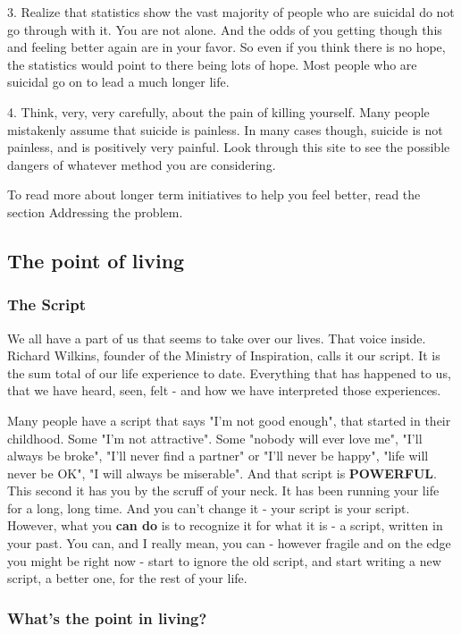 \documentclass[12pt]{article}
\begin{document}
3. Realize that statistics show the vast majority of people who are suicidal do not go through with it. You are not alone. And the odds of you getting though this and feeling better again are in your favor. So even if you think there is no hope, the statistics would point to there being lots of hope. Most people who are suicidal go on to lead a much longer life.

4. Think, very, very carefully, about the pain of killing yourself. Many people mistakenly assume that suicide is painless. In many cases though, suicide is not painless, and is positively very painful. Look through this site to see the possible dangers of whatever method you are considering.

To read more about longer term initiatives to help you feel better, read the section Addressing the problem.

\subsection{The point of living}

\subsubsection{The Script}

We all have a part of us that seems to take over our lives. That voice inside. Richard Wilkins, founder of the Ministry of Inspiration, calls it our script. It is the sum total of our life experience to date. Everything that has happened to us, that we have heard, seen, felt - and how we have interpreted those experiences.

Many people have a script that says "I'm not good enough", that started in their childhood. Some "I'm not attractive". Some "nobody will ever love me", "I'll always be broke", "I'll never find a partner" or "I'll never be happy", "life will never be OK", "I will always be miserable". And that script is \textbf{POWERFUL}. This second it has you by the scruff of your neck. It has been running your life for a long, long time. And you can't change it - your script is your script. However, what you \textbf{can do} is to recognize it for what it is - a script, written in your past. You can, and I really mean, you can - however fragile and on the edge you might be right now - start to ignore the old script, and start writing a new script, a better one, for the rest of your life.

\subsubsection{What's the point in living?}
\end{document}
